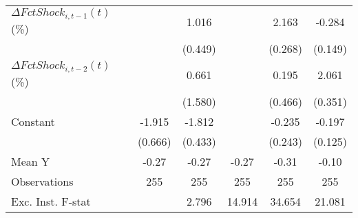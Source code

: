 {\begin{tabular}{l*{5}{c}}
\addlinespace
$ \Delta FctShock_{i,t-1}(t)$ (\%)&                     &       1.016\sym{**} &                     &       2.163\sym{***}&      -0.284\sym{*}  \\
                    &                     &     (0.449)         &                     &     (0.268)         &     (0.149)         \\
\addlinespace
$ \Delta FctShock_{i,t-2}(t)$ (\%)&                     &       0.661         &                     &       0.195         &       2.061\sym{***}\\
                    &                     &     (1.580)         &                     &     (0.466)         &     (0.351)         \\
\addlinespace
Constant            &      -1.915\sym{**} &      -1.812\sym{***}&                     &      -0.235         &      -0.197         \\
                    &     (0.666)         &     (0.433)         &                     &     (0.243)         &     (0.125)         \\
\midrule
Mean Y              &       -0.27         &       -0.27         &       -0.27         &       -0.31         &       -0.10         \\
Observations        &         255         &         255         &         255         &         255         &         255         \\
Exc. Inst. F-stat   &                     &       2.796         &      14.914         &      34.654         &      21.081         \\
\bottomrule
\end{tabular}
}
